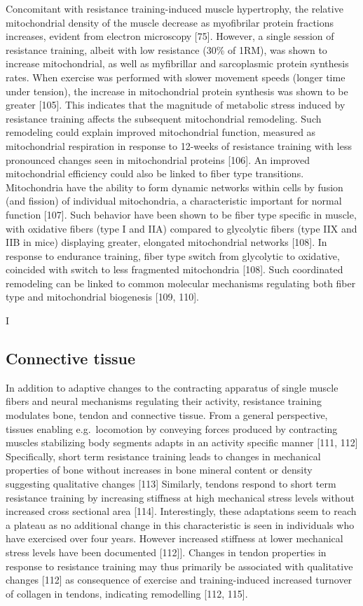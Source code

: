 \documentclass[twoside,10pt]{gihclass} %
\begin{document}
Concomitant with resistance training-induced muscle hypertrophy, the relative mitochondrial density of the muscle decrease as myofibrilar protein fractions increases, evident from electron microscopy
{[}75{]}.
However, a single session of resistance training, albeit with low resistance (30\% of 1RM), was shown to increase mitochondrial, as well as myfibrillar and sarcoplasmic protein synthesis rates. When exercise was performed with slower movement speeds (longer time under tension), the increase in mitochondrial protein synthesis was shown to be greater
{[}105{]}.
This indicates that the magnitude of metabolic stress induced by resistance training affects the subsequent mitochondrial remodeling.
Such remodeling could explain improved mitochondrial function, measured as mitochondrial respiration in response to 12-weeks of resistance training with less pronounced changes seen in mitochondrial proteins
{[}106{]}.
An improved mitochondrial efficiency could also be linked to fiber type transitions.
Mitochondria have the ability to form dynamic networks within cells by fusion (and fission) of individual mitochondria, a characteristic important for normal function
{[}107{]}.
Such behavior have been shown to be fiber type specific in muscle, with oxidative fibers (type I and IIA) compared to glycolytic fibers (type IIX and IIB in mice) displaying greater, elongated mitochondrial networks
{[}108{]}.
In response to endurance training, fiber type switch from glycolytic to oxidative, coincided with switch to less fragmented mitochondria
{[}108{]}.
Such coordinated remodeling can be linked to common molecular mechanisms regulating both fiber type and mitochondrial biogenesis
{[}109, 110{]}.

I

\hypertarget{connective-tissue}{%
\subsection{Connective tissue}\label{connective-tissue}}

In addition to adaptive changes to the contracting apparatus of single muscle fibers and neural mechanisms regulating their activity, resistance training modulates bone, tendon and connective tissue.
From a general perspective, tissues enabling e.g.~locomotion by conveying forces produced by contracting muscles stabilizing body segments adapts in an activity specific manner
{[}111, 112{]}
Specifically, short term resistance training leads to changes in mechanical properties of bone without increases in bone mineral content or density suggesting qualitative changes
{[}113{]}
Similarly, tendons respond to short term resistance training by increasing stiffness at high mechanical stress levels without increased cross sectional area
{[}114{]}.
Interestingly, these adaptations seem to reach a plateau as no additional change in this characteristic is seen in individuals who have exercised over four years. However increased stiffness at lower mechanical stress levels have been documented
{[}112{]}{]}.
Changes in tendon properties in response to resistance training may thus primarily be associated with qualitative changes
{[}112{]}
as consequence of exercise and training-induced increased turnover of collagen in tendons, indicating remodelling
{[}112, 115{]}.
\end{document}
